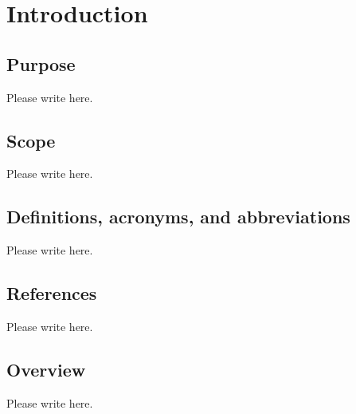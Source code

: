 \section{Introduction}
\md


\subsection{Purpose}

Please write here.


\subsection{Scope}

Please write here.


\subsection{Definitions, acronyms, and abbreviations}

Please write here.


\subsection{References}

Please write here.


\subsection{Overview}

Please write here.

